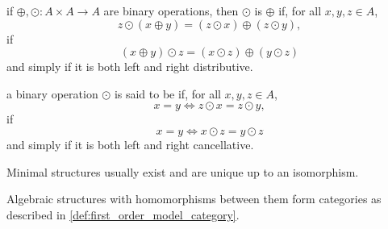 \begin{definition}
\begin{defenum}
     if \( \oplus, \odot: A \times A \to A \) are binary operations, then \( \odot \) is  \( \oplus \) if, for all \( x, y, z \in A \),
    \begin{equation*}
      z \odot (x \oplus y) = (z \odot x) \oplus (z \odot y),
    \end{equation*}
     if
    \begin{equation*}
      (x \oplus y) \odot z = (x \odot z) \oplus (y \odot z)
    \end{equation*}
    and simply  if it is both left and right distributive.

     a binary operation \( \odot \) is said to be  if, for all \( x, y, z \in A \),
    \begin{equation*}
      x = y \iff z \odot x = z \odot y,
    \end{equation*}
     if
    \begin{equation*}
      x = y \iff x \odot z = y \odot z
    \end{equation*}
    and simply  if it is both left and right cancellative.
  \end{defenum}

  Minimal structures usually exist and are unique up to an isomorphism.

  Algebraic structures with homomorphisms between them form categories as described in \cref{def:first_order_model_category}.
\end{definition}
